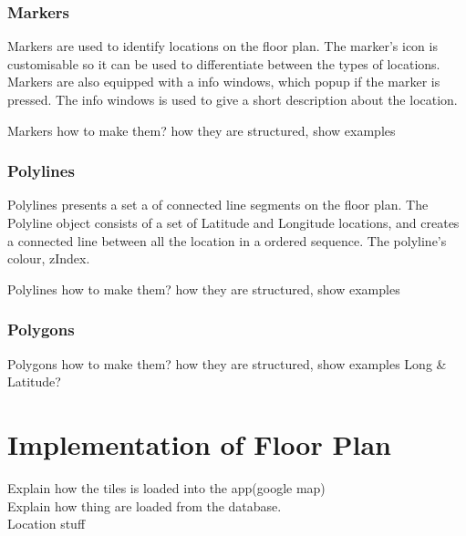 \subsubsection*{Markers}
Markers are used to identify locations on the floor plan. The marker's icon is customisable so it can be used to differentiate between the types of locations. Markers are also equipped with a info windows, which popup if the marker is pressed. The info windows is used to give a short description about the location.

 
Markers how to make them? how they are structured, show examples
\subsubsection*{Polylines}
Polylines presents a set a of connected line segments on the floor plan. The Polyline object consists of a set of Latitude and Longitude locations, and creates a connected line between all the location in a ordered sequence. The polyline's colour, zIndex.


Polylines how to make them? how they are structured, show examples
\subsubsection*{Polygons}

Polygons how to make them? how they are structured, show examples
Long \& Latitude?\\


\section*{Implementation of Floor Plan} 
Explain how the tiles is loaded into the app(google map)\\
Explain how thing are loaded from the database.\\
Location stuff
	

